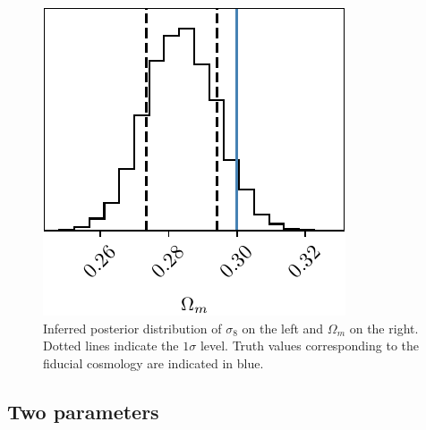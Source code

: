 \begin{figure}[h]
\begin{minipage}[b]{0.48\textwidth}
        \includegraphics[width=\textwidth]{images/6_MCMC_omega_parameters.pdf}
    \end{minipage}
\caption{\label{fig:MCMC one parameter} Inferred posterior distribution of $\sigma_8$ on the left and $\Omega_m$ on the right. Dotted lines indicate the $1\sigma$ level. Truth values corresponding to the fiducial cosmology are indicated in blue.}
\end{figure}

\subsection{Two parameters}
